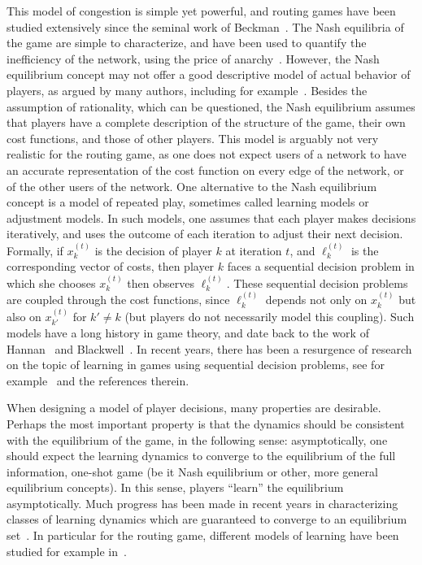 \documentclass{sig-alternate-ipsn13}
\begin{document}
This model of congestion is simple yet powerful, and routing games have been studied extensively since the seminal work of Beckman~\cite{beckmann1955studies}. The Nash equilibria of the game are simple to characterize, and have been used to quantify the inefficiency of the network, using the price of anarchy~\cite{roughgarden2002bad}. However, the Nash equilibrium concept may not offer a good descriptive model of actual behavior of players, as argued by many authors, including for example~\cite{fox2013population}. Besides the assumption of rationality, which can be questioned, the Nash equilibrium assumes that players have a complete description of the structure of the game, their own cost functions, and those of other players. This model is arguably not very realistic for the routing game, as one does not expect users of a network to have an accurate representation of the cost function on every edge of the network, or of the other users of the network.
One alternative to the Nash equilibrium concept is a model of repeated play, sometimes called learning models or adjustment models. In such models, one assumes that each player makes decisions iteratively, and uses the outcome of each iteration to adjust their next decision. Formally, if $x_k^{(t)}$ is the decision of player $k$ at iteration $t$, and $\ell^{(t)}_k$ is the corresponding vector of costs, then player $k$ faces a sequential decision problem in which she chooses $x^{(t)}_k$ then observes $\ell_k^{(t)}$. These sequential decision problems are coupled through the cost functions, since $\ell_k^{(t)}$ depends not only on $x_k^{(t)}$ but also on $x_{k'}^{(t)}$ for $k' \neq k$ (but players do not necessarily model this coupling). Such models have a long history in game theory, and date back to the work of Hannan~\cite{hannan1957approximations} and Blackwell~\cite{blackwell1956analog}. In recent years, there has been a resurgence of research on the topic of learning in games using sequential decision problems, see for example~\cite{cesa2006prediction} and the references therein.

When designing a model of player decisions, many properties are desirable. Perhaps the most important property is that the dynamics should be consistent with the equilibrium of the game, in the following sense: asymptotically, one should expect the learning dynamics to converge to the equilibrium of the full information, one-shot game (be it Nash equilibrium or other, more general equilibrium concepts). In this sense, players ``learn'' the equilibrium asymptotically. Much progress has been made in recent years in characterizing classes of learning dynamics which are guaranteed to converge to an equilibrium set~\cite{freund1999adaptive, hart2001general, hart2005adaptive, fox2013population}. In particular for the routing game, different models of learning have been studied for example in~\cite{fischer2004evolution,blum2006routing,kleinberg2009multiplicative,krichene2015learning,krichene2015SMD}.
\end{document}
